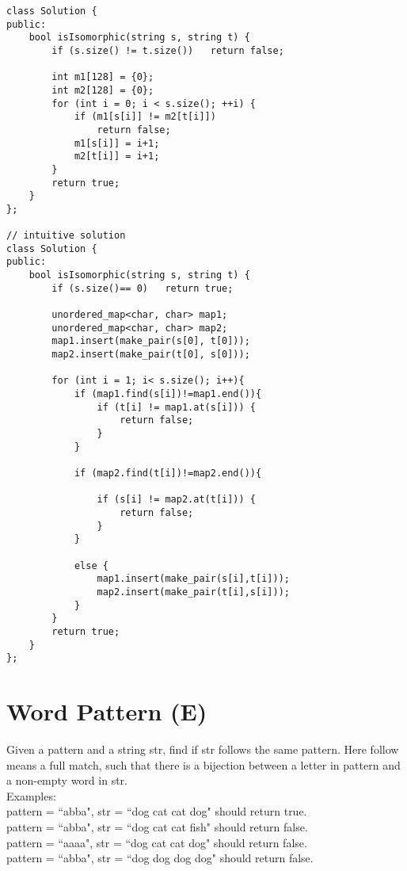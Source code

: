 \begin{lstlisting}
class Solution {
public:
    bool isIsomorphic(string s, string t) {
        if (s.size() != t.size())   return false;
            
        int m1[128] = {0};
        int m2[128] = {0};
        for (int i = 0; i < s.size(); ++i) {
            if (m1[s[i]] != m2[t[i]])
                return false;
            m1[s[i]] = i+1;
            m2[t[i]] = i+1;
        }
        return true;
    }
};

// intuitive solution  
class Solution {
public:
    bool isIsomorphic(string s, string t) {
        if (s.size()== 0)   return true;
        
        unordered_map<char, char> map1;
        unordered_map<char, char> map2;
        map1.insert(make_pair(s[0], t[0]));
        map2.insert(make_pair(t[0], s[0]));
        
        for (int i = 1; i< s.size(); i++){
            if (map1.find(s[i])!=map1.end()){
                if (t[i] != map1.at(s[i])) {
                    return false;
                }
            }
            
            if (map2.find(t[i])!=map2.end()){
                
                if (s[i] != map2.at(t[i])) {
                    return false;
                }
            }
            
            else {
                map1.insert(make_pair(s[i],t[i]));
                map2.insert(make_pair(t[i],s[i]));
            }
        }
        return true;
    }
};
\end{lstlisting}


\section{Word Pattern (E)}
Given a pattern and a string str, find if str follows the same pattern. Here follow means a full match, such that there is a bijection between a letter in pattern and a non-empty word in str. \\

Examples:\\
    pattern = ``abba", str = ``dog cat cat dog" should return true.\\
    pattern = ``abba", str = ``dog cat cat fish" should return false.\\
    pattern = ``aaaa", str = ``dog cat cat dog" should return false.\\
    pattern = ``abba", str = ``dog dog dog dog" should return false.\\

